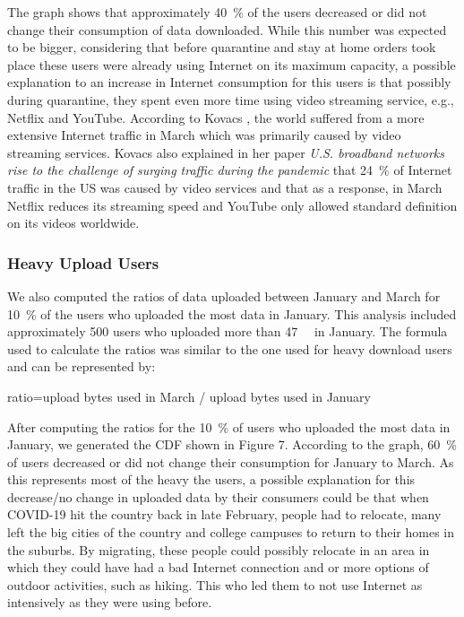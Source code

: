 \documentclass[conference,10pt]{IEEEtran}
\begin{document}
The graph shows that approximately \SI{40}{\percent} of the users decreased or did not change their consumption of data downloaded. While this number was expected to be bigger, considering that before quarantine and stay at home orders took place these users were already using  Internet on its maximum capacity, a possible explanation to an increase in Internet consumption for this users is that possibly during quarantine, they spent even more time using video streaming service, e.g., Netflix and YouTube. According to Kovacs \cite{kovacs}, the world suffered from a more extensive Internet traffic in March which was primarily caused by video streaming services. Kovacs also explained in her paper \textit{U.S. broadband networks rise to the challenge of surging traffic during the pandemic} that \SI{24}{\percent} of  Internet traffic in the US was caused by video services and that as a response, in March Netflix reduces its streaming speed and YouTube only allowed standard definition on its videos worldwide.

\subsubsection{Heavy Upload Users}
\label{sec:heavy-upload-users}

We also computed the ratios of data uploaded between January and March for \SI{10}{\percent} of the users who uploaded the most data in January. This analysis included approximately 500 users who uploaded more than \SI{47}{\giga\byte} in January. The formula used to calculate the ratios was similar to the one used for heavy download users and can be represented by:

ratio=upload bytes used in March / upload bytes used in January

After computing the ratios for the \SI{10}{\percent} of users who uploaded the most data in January, we generated the CDF shown in Figure 7. According to the graph, \SI{60}{\percent} of users decreased or did not change their consumption for January to March. As this represents most of the heavy the users, a possible explanation for this decrease/no change in uploaded data by their consumers could be that when COVID-19 hit the country back in late February, people had to relocate, many left the big cities of the country and college campuses to return to their homes in the suburbs. By migrating, these people could possibly relocate in an area in which they could have had a bad Internet connection and or more options of outdoor activities, such as hiking. This who led them to not use  Internet as intensively as they were using before.
\end{document}

